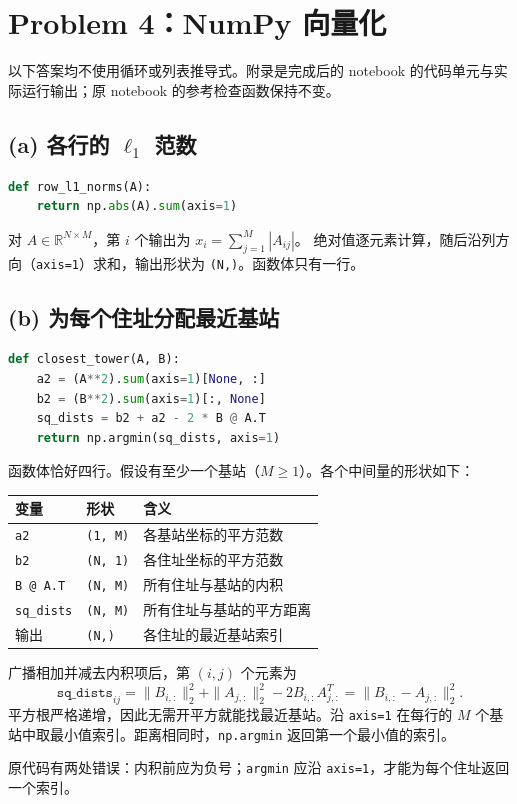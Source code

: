 \documentclass[11pt,UTF8,fontset=windows]{ctexart}
\newcommand{\R}{\mathbb R}
\begin{document}
\section*{Problem 4：NumPy 向量化}
以下答案均不使用循环或列表推导式。附录是完成后的 notebook 的代码单元与实际运行输出；原 notebook 的参考检查函数保持不变。
\subsection*{(a) 各行的 $\ell_1$ 范数}
\begin{lstlisting}[language=Python]
def row_l1_norms(A):
    return np.abs(A).sum(axis=1)
\end{lstlisting}
对 $A\in\R^{N\times M}$，第 $i$ 个输出为 $x_i=\sum_{j=1}^M|A_{ij}|$。
绝对值逐元素计算，随后沿列方向（\texttt{axis=1}）求和，输出形状为 \texttt{(N,)}。函数体只有一行。
\subsection*{(b) 为每个住址分配最近基站}
\begin{lstlisting}[language=Python]
def closest_tower(A, B):
    a2 = (A**2).sum(axis=1)[None, :]
    b2 = (B**2).sum(axis=1)[:, None]
    sq_dists = b2 + a2 - 2 * B @ A.T
    return np.argmin(sq_dists, axis=1)
\end{lstlisting}
函数体恰好四行。假设有至少一个基站（$M\ge1$）。各个中间量的形状如下：
\begin{center}
\begin{tabular}{lll}
\hline
变量 & 形状 & 含义\\\hline
\texttt{a2} & \texttt{(1, M)} & 各基站坐标的平方范数\\
\texttt{b2} & \texttt{(N, 1)} & 各住址坐标的平方范数\\
\texttt{B @ A.T} & \texttt{(N, M)} & 所有住址与基站的内积\\
\texttt{sq\_dists} & \texttt{(N, M)} & 所有住址与基站的平方距离\\
输出 & \texttt{(N,)} & 各住址的最近基站索引\\\hline
\end{tabular}
\end{center}
广播相加并减去内积项后，第 $(i,j)$ 个元素为
\[
 \texttt{sq\_dists}_{ij}=\|B_{i,:}\|_2^2+\|A_{j,:}\|_2^2
 -2B_{i,:}A_{j,:}^T=\|B_{i,:}-A_{j,:}\|_2^2.
\]
平方根严格递增，因此无需开平方就能找最近基站。沿 \texttt{axis=1} 在每行的 $M$ 个基站中取最小值索引。距离相同时，\texttt{np.argmin} 返回第一个最小值的索引。

原代码有两处错误：内积前应为负号；\texttt{argmin} 应沿 \texttt{axis=1}，才能为每个住址返回一个索引。
\clearpage
\end{document}
